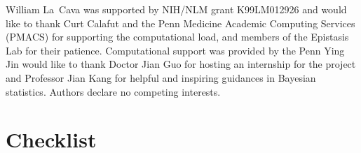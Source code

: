 \documentclass{article}
\begin{document}

\begin{ack}

    William La~Cava was supported by NIH/NLM grant K99LM012926 and would like to thank Curt Calafut and the Penn Medicine Academic Computing Services (PMACS) for supporting the computational load, and members of the Epistasis Lab for their patience.   
    Computational support was provided by the Penn 
    Ying Jin would like to thank Doctor Jian Guo for hosting an internship for the project and Professor Jian Kang for helpful and inspiring guidances in Bayesian statistics.
    Authors declare no competing interests. 
\end{ack}


\medskip

{
\small



}

\section*{Checklist}
\end{document}
